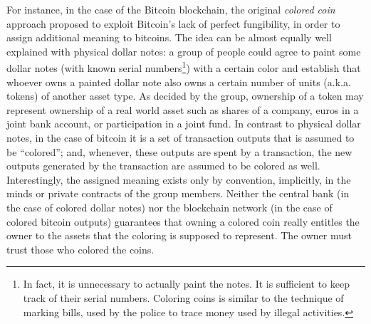 \documentclass{llncs}
\begin{document}
For instance, in the case of the Bitcoin blockchain, the original \emph{colored coin} approach proposed to exploit Bitcoin's lack of perfect fungibility, in order to assign additional meaning to bitcoins. The idea can be almost equally well explained with physical dollar notes: a group of people could agree to paint some dollar notes (with known serial numbers\footnote{In fact, it is unnecessary to actually paint the notes. It is sufficient to keep track of their serial numbers. Coloring coins is similar to the technique of marking bills, used by the police to trace money used by illegal activities.}) with a certain color and establish that whoever owns a painted dollar note also owns a certain number of units (a.k.a. tokens) of another asset type. As decided by the group, ownership of a token may represent ownership of a real world asset such as shares of a company, euros in a joint bank account, or participation in a joint fund. In contrast to physical dollar notes, in the case of bitcoin it is a set of transaction outputs that is assumed to be ``colored''; and, whenever, these outputs are spent by a transaction, the new outputs generated by the transaction are assumed to be colored as well. %
Interestingly, the assigned meaning exists only by convention, implicitly, in the minds or private contracts of the group members. Neither the central bank (in the case of colored dollar notes) nor the blockchain network (in the case of colored bitcoin outputs) guarantees that owning a colored coin really entitles the owner to the assets that the coloring is supposed to represent. The owner must trust those who colored the coins.
\end{document}
